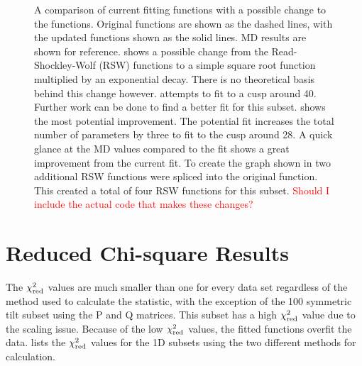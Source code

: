 \documentclass[twoside,senior]{BYUPhys}
\begin{document}
\begin{figure}[ht!]
 
 \caption[Possible changes to fitting functions for the 1D twist subsets.]{\label{fig:updatedGraphs} A comparison of current fitting functions with a possible change to the functions.  Original functions are shown as the dashed lines, with the updated functions shown as the solid lines.  MD results are shown for reference. \protect{} shows a possible change from the Read-Shockley-Wolf (RSW) functions to a simple square root function multiplied by an exponential decay.  There is no theoretical basis behind this change however. \protect{} attempts to fit to a cusp around 40\textdegree{}.  Further work can be done to find a better fit for this subset. \protect{} shows the most potential improvement.  The potential fit increases the total number of parameters by three to fit to the cusp around 28\textdegree.  A quick glance at the MD values compared to the fit shows a great improvement from the current fit.  To create the graph shown in \protect{} two additional RSW functions were spliced into the original function.  This created a total of four RSW functions for this subset. \textcolor{red}{Should I include the actual code that makes these changes?}}
 
\end{figure}

\section{Reduced Chi-square Results\label{results:chi2red}}
The $\chi_{\textnormal{red}}^2$ values are much smaller than one for every data set regardless of the method used to calculate the statistic, with the exception of the \textlangle{}100\textrangle{} symmetric tilt subset using the P and Q matrices.  This subset has a high $\chi_{\textnormal{red}}^2$ value due to the scaling issue.  Because of the low $\chi_{\textnormal{red}}^2$ values, the fitted functions overfit the data.\cite{bevington2003}   lists the $\chi_{\textnormal{red}}^2$ values for the 1D subsets using the two different methods for calculation. 
\end{document}
